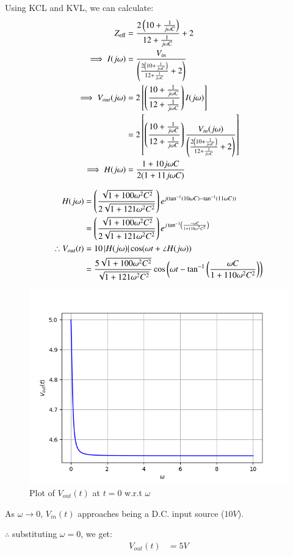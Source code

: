 \documentclass[journal,12pt,twocolumn]{IEEEtran}
\theoremstyle{remark}
\begin{document}

Using KCL and KVL, we can calculate:
\begin{align}
    Z_{\text{eff}} &= \frac{2\left(10 + \frac{1}{j\omega C}\right)}{12 + \frac{1}{j\omega C}} + 2\\
    \implies I(j\omega) &= \frac{V_{in}}{\left(\frac{2\left(10 + \frac{1}{j\omega C}\right)}{12 + \frac{1}{j \omega C}}+2\right)}\\
    \implies V_{out}(j\omega) &= 2{}\left[\left(\frac{10 + \frac{1}{j\omega C}}{12 + \frac{1}{j\omega C}}\right)I(j\omega)\right]\\
    &= 2{}\left[\left(\frac{10 + \frac{1}{j\omega C}}{12 + \frac{1}{j\omega C}}\right)\frac{V_{in}(j\omega)}{\left(\frac{2\left(10 + \frac{1}{j\omega C}\right)}{12 + \frac{1}{j \omega C}}+2\right)}\right]\\
    \implies H(j\omega) &= \frac{1 + 10j\omega C}{2(1 + 11j\omega C)}
\end{align}

\begin{align}
    H(j\omega) &= \left(\frac{\sqrt{1 + 100\omega^2 C^2}}{2\sqrt{1 + 121\omega^2 C^2}}\right)e^{j(\tan^{-1}(10\omega C) - \tan^{-1}(11\omega C))}\\
    &= \left(\frac{\sqrt{1 + 100\omega^2 C^2}}{2\sqrt{1 + 121\omega^2 C^2}}\right)e^{j\tan^{-1}\left(\frac{-\omega C}{1 + 110\omega^2 C^2}\right)}\\
    \therefore V_{out}(t) &= 10\left\vert H(j\omega)\right\vert\cos(\omega t + \angle H(j\omega))\\
    &= \frac{5\sqrt{1 + 100\omega^2 C^2}}{\sqrt{1 + 121\omega^2 C^2}}\cos\left(\omega t -\tan^{-1}\left(\frac{\omega C}{1 + 110\omega^2 C^2}\right)\right)
\end{align}
\begin{figure}[!h]
    \centering
    \includegraphics[width = \columnwidth]{figs/V_out_plot.png}
    \caption{Plot of $V_{out}(t)$ at $t=0$ w.r.t $\omega$}
    \label{fig:3_gate.22.ee.31}
\end{figure}

As $\omega \rightarrow 0$, $V_{in}(t)$ approaches being a D.C. input source ($10V$).

$\therefore$ substituting $\omega = 0$, we get:
\begin{align}
    V_{out}(t) &= 5V
\end{align}
\end{document}

